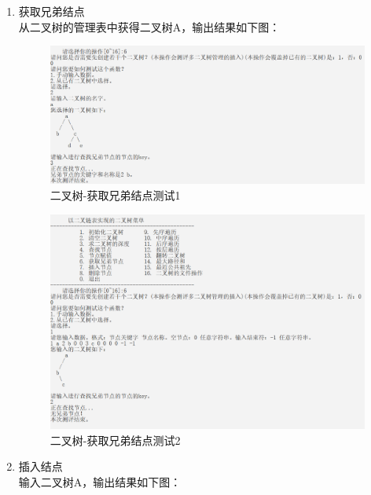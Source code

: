 \documentclass[supercite]{Experimental_Report}
\theoremstyle{definition}
\begin{document}
\begin{enumerate}
\begin{figure}[htb]
		\end{figure}
		\newpage
	\item 获取兄弟结点\\
	从二叉树的管理表中获得二叉树A，输出结果如下图：
		\begin{figure}[htb]
			\begin{center}
				\includegraphics[scale=0.50]{images/二叉树-获取兄弟节点.png}
				\caption{二叉树-获取兄弟结点测试1}
				\label{fig2-6.1}
			\end{center}
		\end{figure}
		\begin{figure}[htb]
			\begin{center}
				\includegraphics[scale=0.50]{images/二叉树-获取兄弟节点异常.png}
				\caption{二叉树-获取兄弟结点测试2}
				\label{fig2-6.2}
			\end{center}
		\end{figure}
		\newpage
	\item 插入结点\\
	输入二叉树A，输出结果如下图：
		\begin{figure}[htb]
			\begin{center}

\end{center}
\end{figure}
\end{enumerate}
\end{document}
